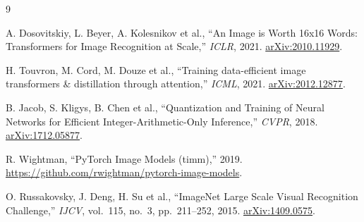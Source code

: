 \documentclass[12pt,a4paper]{article}
\begin{document}
\begin{thebibliography}{9}

A. Dosovitskiy, L. Beyer, A. Kolesnikov et al.,
``An Image is Worth 16x16 Words: Transformers for Image Recognition at Scale,''
\emph{ICLR}, 2021. \href{https://arxiv.org/abs/2010.11929}{arXiv:2010.11929}.

H. Touvron, M. Cord, M. Douze et al.,
``Training data-efficient image transformers \& distillation through attention,''
\emph{ICML}, 2021. \href{https://arxiv.org/abs/2012.12877}{arXiv:2012.12877}.

B. Jacob, S. Kligys, B. Chen et al.,
``Quantization and Training of Neural Networks for Efficient Integer-Arithmetic-Only Inference,''
\emph{CVPR}, 2018. \href{https://arxiv.org/abs/1712.05877}{arXiv:1712.05877}.

R. Wightman, ``PyTorch Image Models (timm),'' 2019.
\url{https://github.com/rwightman/pytorch-image-models}.

O. Russakovsky, J. Deng, H. Su et al.,
``ImageNet Large Scale Visual Recognition Challenge,''
\emph{IJCV}, vol.~115, no.~3, pp.~211--252, 2015.
\href{https://arxiv.org/abs/1409.0575}{arXiv:1409.0575}.

\end{thebibliography}
\end{document}
